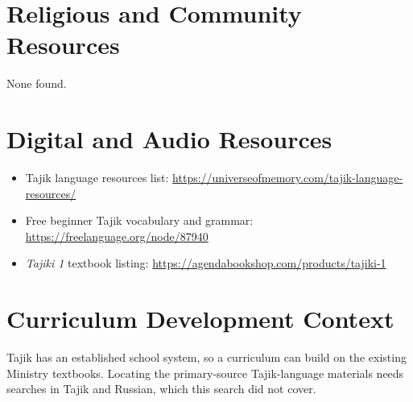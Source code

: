 \documentclass[12pt]{article}
\begin{document}
\section{Religious and Community Resources}
None found.

\section{Digital and Audio Resources}
\begin{itemize}
\item Tajik language resources list: \url{https://universeofmemory.com/tajik-language-resources/}
\item Free beginner Tajik vocabulary and grammar: \url{https://freelanguage.org/node/87940}
\item \emph{Tajiki 1} textbook listing: \url{https://agendabookshop.com/products/tajiki-1}
\end{itemize}

\section{Curriculum Development Context}
Tajik has an established school system, so a curriculum can build on the existing Ministry textbooks. Locating the primary-source Tajik-language materials needs searches in Tajik and Russian, which this search did not cover.
\end{document}
